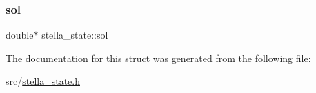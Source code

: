 \subsubsection{\texorpdfstring{sol}{sol}}
{\footnotesize\ttfamily double$\ast$ stella\+\_\+state\+::sol}



The documentation for this struct was generated from the following file\+:\begin{DoxyCompactItemize}
\item 
src/\mbox{\hyperlink{stella__state_8h}{stella\+\_\+state.\+h}}\end{DoxyCompactItemize}
